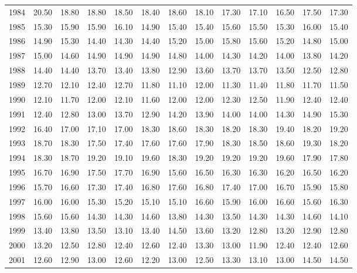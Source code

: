 \begin{longtable}{rrrrrrrrrrrrr}
  1984 & 20.50 & 18.80 & 18.80 & 18.50 & 18.40 & 18.60 & 18.10 & 17.30 & 17.10 & 16.50 & 17.50 & 17.30 \\ 
  1985 & 15.30 & 15.90 & 15.90 & 16.10 & 14.90 & 15.40 & 15.40 & 15.60 & 15.50 & 15.30 & 16.00 & 15.40 \\ 
  1986 & 14.90 & 15.30 & 14.40 & 14.30 & 14.40 & 15.20 & 15.00 & 15.80 & 15.60 & 15.20 & 14.80 & 15.00 \\ 
  1987 & 15.00 & 14.60 & 14.90 & 14.90 & 14.90 & 14.80 & 14.00 & 14.30 & 14.20 & 14.00 & 13.80 & 14.20 \\ 
  1988 & 14.40 & 14.40 & 13.70 & 13.40 & 13.80 & 12.90 & 13.60 & 13.70 & 13.70 & 13.50 & 12.50 & 12.80 \\ 
  1989 & 12.70 & 12.10 & 12.40 & 12.70 & 11.80 & 11.10 & 12.00 & 11.30 & 11.40 & 11.80 & 11.70 & 11.50 \\ 
  1990 & 12.10 & 11.70 & 12.00 & 12.10 & 11.60 & 12.00 & 12.00 & 12.30 & 12.50 & 11.90 & 12.40 & 12.40 \\ 
  1991 & 12.40 & 12.80 & 13.00 & 13.70 & 12.90 & 14.20 & 13.90 & 14.00 & 14.00 & 14.30 & 14.90 & 15.30 \\ 
  1992 & 16.40 & 17.00 & 17.10 & 17.00 & 18.30 & 18.60 & 18.30 & 18.20 & 18.30 & 19.40 & 18.20 & 19.20 \\ 
  1993 & 18.70 & 18.30 & 17.50 & 17.40 & 17.60 & 17.60 & 17.90 & 18.30 & 18.50 & 18.60 & 19.30 & 18.20 \\ 
  1994 & 18.30 & 18.70 & 19.20 & 19.10 & 19.60 & 18.30 & 19.20 & 19.20 & 19.20 & 19.60 & 17.90 & 17.80 \\ 
  1995 & 16.70 & 16.90 & 17.50 & 17.70 & 16.90 & 15.60 & 16.50 & 16.30 & 16.30 & 16.20 & 16.50 & 16.20 \\ 
  1996 & 15.70 & 16.60 & 17.30 & 17.40 & 16.80 & 17.60 & 16.80 & 17.40 & 17.00 & 16.70 & 15.90 & 15.80 \\ 
  1997 & 16.00 & 16.00 & 15.30 & 15.20 & 15.10 & 15.10 & 16.60 & 15.90 & 16.00 & 16.60 & 15.60 & 16.30 \\ 
  1998 & 15.60 & 15.60 & 14.30 & 14.30 & 14.60 & 13.80 & 14.30 & 13.50 & 14.30 & 14.30 & 14.60 & 14.10 \\ 
  1999 & 13.40 & 13.80 & 13.50 & 13.10 & 13.40 & 14.50 & 13.60 & 13.20 & 12.80 & 13.20 & 12.90 & 12.80 \\ 
  2000 & 13.20 & 12.50 & 12.80 & 12.40 & 12.60 & 12.40 & 13.30 & 13.00 & 11.90 & 12.40 & 12.40 & 12.60 \\ 
  2001 & 12.60 & 12.90 & 13.00 & 12.60 & 12.20 & 13.00 & 12.50 & 13.30 & 13.10 & 13.00 & 14.50 & 14.50 \\ 

\end{longtable}
